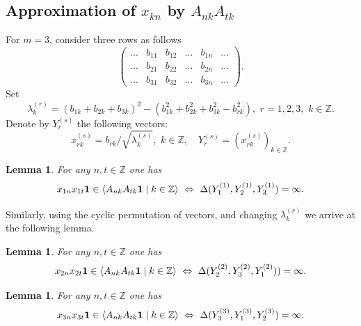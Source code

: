 \documentclass[preprint,12pt]{elsarticle}
\newtheorem{lem}[thm]{Lemma}
\numberwithin{equation}{section}
\begin{document}
 \subsection{Approximation of 
 $x_{kn}$ by $A_{nk}A_{tk}$  }
 \label{7.2}
For $m=3$, consider three rows as follows
$$
\left(
\begin{array}{cccccc}
...&b_{11}&b_{12}&...&b_{1n}&...\\
...&b_{21}&b_{22}&...&b_{2n}&...\\
...&b_{31}&b_{32}&...&b_{3n}&...
\end{array}
\right).
$$
Set
\begin{equation}
 \label{lambda(x,x)}
\lambda_k^{(r)}=(b_{1k}+b_{2k}+b_{3k})^2-(b_{1k}^2+b_{2k}^2+b_{3k}^2-b_{rk}^2),\,\,r=1,2,3,\,\,k\in \mathbb Z.
\end{equation}
Denote by $Y_r^{(s)}$  the following vectors:
\begin{equation}
 \label{y(1),y(3),y(3)}
 x_{rk}^{(s)}=
b_{rk}/ \sqrt{\lambda_k^{(s)}}
,\,\,k\in{\mathbb Z},\quad Y_r^{(s)}=(x_{rk}^{(s)})_{k\in {\mathbb Z}}.
\end{equation}
%
\begin{lem}
\label{x1x1.3}
For any  $n,t\in {\mathbb Z}$ one has
$$
x_{1n}x_{1t}{\bf 1}\in\langle A_{nk}A_{tk}{\bf 1}\mid k\in{\mathbb
Z}\rangle \,\,\Leftrightarrow\,\,
\Delta(Y_1^{(1)},Y_2^{(1)},Y_3^{(1)})=\infty.
$$
\end{lem}
Similarly, using the cyclic permutation of vectors, and changing $\lambda_k^{(r)}$ we arrive at the following lemma.
\begin{lem}
\label{x2x2.3}
  For any  $n,t\in {\mathbb Z}$ one has
$$
x_{2n}x_{2t}{\bf 1}\in\langle A_{nk}A_{tk}{\bf 1}\mid k\in{\mathbb
Z}\rangle \,\,\Leftrightarrow\,\,
\Delta(Y_2^{(2)},Y_3^{(2)},Y_1^{(2)}))=\infty.
$$
\end{lem}
\begin{lem}
\label{x3x3.3}
For any  $n,t\in {\mathbb Z}$ one has
$$
x_{3n}x_{3t}{\bf 1}\in\langle A_{nk}A_{tk}{\bf 1}\mid k\in{\mathbb
Z}\rangle \,\,\Leftrightarrow\,\,
\Delta(Y_3^{(3)},Y_1^{(3)},Y_2^{(3)})=\infty.
$$
\end{lem}
%
\end{document}
